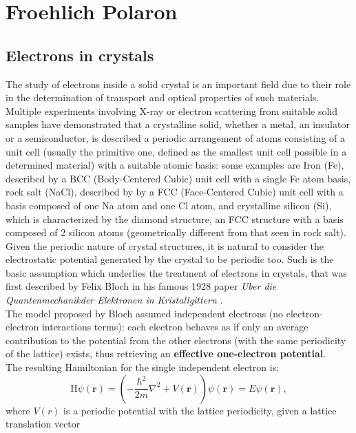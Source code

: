 \section{Froehlich Polaron}
\subsection{Electrons in crystals}
The study of electrons inside a solid crystal is an important field due to their role in the determination of transport
and optical properties of such materials.\\
Multiple experiments involving X-ray or electron scattering from suitable solid samples have demonstrated that a crystalline solid, 
whether a metal, an insulator or a semiconductor, is described a periodic arrangement of atoms consisting of a unit cell 
(usually the primitive one, defined as the smallest unit cell possible in a determined material) with a suitable 
atomic basis: some examples are Iron (Fe), described by a BCC (Body-Centered Cubic) unit cell with a single Fe atom basis, 
rock salt (NaCl), described by by a FCC (Face-Centered Cubic) unit cell with a basis composed of one Na atom and one Cl atom, and 
crystalline silicon (Si), which is characterized by the diamond structure, an FCC structure with a basis composed of 2 silicon atoms 
(geometrically different from that seen in rock salt). \\
Given the periodic nature of crystal structures, it is natural to consider the electrostatic potential generated by the crystal to 
be periodic too. Such is the basic assumption which underlies the treatment of electrons in crystals, that was first described by 
Felix Bloch in his famous 1928 paper \textit{Uber die Quantenmechanikder Elektronen in Kristallgittern} \cite{bloch1928quantum}.\\
The model proposed by Bloch assumed independent electrons (no electron-electron interactions terms): each electron behaves as 
if only an average contribution to the potential from the other electrons (with the same periodicity of the lattice) exists, thus 
retrieving an \textbf{effective one-electron potential}.\\
The resulting Hamiltonian for the single independent electron is:
\begin{equation}
    \mathrm{H}\psi(\mathbf{r})=\left(-\frac{\hbar^2}{2m}\nabla^2+V(\mathbf{r})\right)\psi(\mathbf{r})=E\psi(\mathbf{r}),
    \label{eq_0_00}
\end{equation}
where $V(r)$ is a periodic potential with the lattice periodicity, given a lattice translation vector
